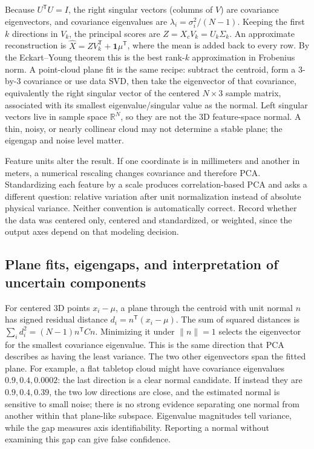 Because \(U^\mathsf TU=I\), the right singular vectors (columns of \(V\)) are covariance eigenvectors, and covariance eigenvalues are \(\lambda_i=\sigma_i^2/(N-1)\). Keeping the first \(k\) directions in \(V_k\), the principal scores are \(Z=X_cV_k=U_k\Sigma_k\). An approximate reconstruction is \(\hat X=ZV_k^\mathsf T+\mathbf1\mu^\mathsf T\), where the mean is added back to every row. By the Eckart--Young theorem this is the best rank-\(k\) approximation in Frobenius norm. A point-cloud plane fit is the same recipe: subtract the centroid, form a 3-by-3 covariance or use data SVD, then take the eigenvector of that covariance, equivalently the right singular vector of the centered \(N\times3\) sample matrix, associated with its smallest eigenvalue/singular value as the normal. Left singular vectors live in sample space \(\mathbb R^N\), so they are not the 3D feature-space normal. A thin, noisy, or nearly collinear cloud may not determine a stable plane; the eigengap and noise level matter.

Feature units alter the result. If one coordinate is in millimeters and another in meters, a numerical rescaling changes covariance and therefore PCA. Standardizing each feature by a scale produces correlation-based PCA and asks a different question: relative variation after unit normalization instead of absolute physical variance. Neither convention is automatically correct. Record whether the data was centered only, centered and standardized, or weighted, since the output axes depend on that modeling decision.

\subsection{Plane fits, eigengaps, and interpretation of uncertain components}\label{02-foundations-ii-ch024-plane-fits-eigengaps-and-interpretation-of-uncertain-components}

\hypertarget{02-foundations-ii-ch024-plane-fits-eigengaps-and-interpretation-of-uncertain-components}{}

For centered 3D points \(x_i-\mu\), a plane through the centroid with unit normal \(n\) has signed residual distance \(d_i=n^\mathsf T(x_i-\mu)\). The sum of squared distances is \(\sum_i d_i^2=(N-1)n^\mathsf TCn\). Minimizing it under \(\|n\|=1\) selects the eigenvector for the smallest covariance eigenvalue. This is the same direction that PCA describes as having the least variance. The two other eigenvectors span the fitted plane. For example, a flat tabletop cloud might have covariance eigenvalues \(0.9,0.4,0.0002\): the last direction is a clear normal candidate. If instead they are \(0.9,0.4,0.39\), the two low directions are close, and the estimated normal is sensitive to small noise; there is no strong evidence separating one normal from another within that plane-like subspace. Eigenvalue magnitudes tell variance, while the gap measures axis identifiability. Reporting a normal without examining this gap can give false confidence.

